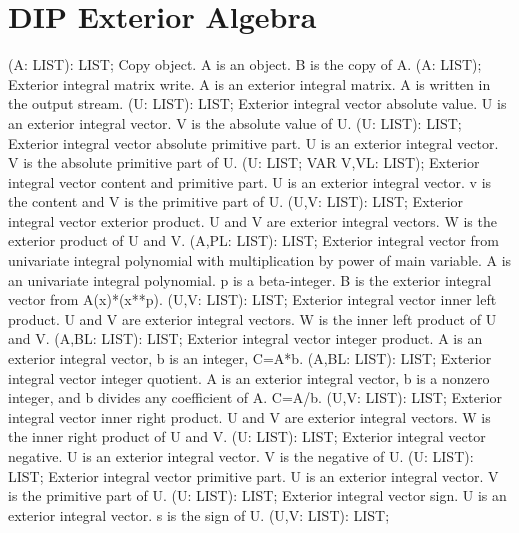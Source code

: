 \section{ DIP Exterior Algebra  } 
 (A: LIST): LIST; \eproc
\bcom Copy object. A is an object. B is the copy of A. \ecom 
{} (A: LIST); \eproc
\bcom Exterior integral matrix write. A is an exterior
integral matrix. A is written in the output stream. \ecom 
{} (U: LIST): LIST; \eproc
\bcom Exterior integral vector absolute value. U is an
exterior integral vector. V is the absolute value of U.  \ecom 
{} (U: LIST): LIST; \eproc
\bcom Exterior integral vector absolute primitive part. U is an
exterior integral vector. V is the absolute primitive part of U.  \ecom 
{} (U: LIST; VAR V,VL: LIST); \eproc
\bcom Exterior integral vector content and primitive part.
U is an exterior integral vector. v is the content and
V is the primitive part of U.  \ecom 
{} (U,V: LIST): LIST; \eproc
\bcom Exterior integral vector exterior product. U and V are exterior
integral vectors. W is the exterior product of U and V. \ecom 
{} (A,PL: LIST): LIST; \eproc
\bcom Exterior integral vector from univariate integral polynomial
with multiplication by power of main variable. A is an
univariate integral polynomial. p is a beta-integer. B is the
exterior integral vector from A(x)*(x**p).  \ecom 
{} (U,V: LIST): LIST; \eproc
\bcom Exterior integral vector inner left product. U and V are
exterior integral vectors. W is the inner left
product of U and V. \ecom 
{} (A,BL: LIST): LIST; \eproc
\bcom Exterior integral vector integer product. A is an
exterior integral vector, b is an integer, C=A*b.  \ecom 
{} (A,BL: LIST): LIST; \eproc
\bcom Exterior integral vector integer quotient. A is an
exterior integral vector, b is a nonzero integer,
and b divides any coefficient of A. C=A/b. \ecom 
{} (U,V: LIST): LIST; \eproc
\bcom Exterior integral vector inner right product. U and V are
exterior integral vectors. W is the inner right
product of U and V. \ecom 
{} (U: LIST): LIST; \eproc
\bcom Exterior integral vector negative. U is an exterior
integral vector. V is the negative of U.  \ecom 
{} (U: LIST): LIST; \eproc
\bcom Exterior integral vector primitive part. U is an
exterior integral vector. V is the primitive part of U.  \ecom 
{} (U: LIST): LIST; \eproc
\bcom Exterior integral vector sign. U is an exterior
integral vector. s is the sign of U.  \ecom 
{} (U,V: LIST): LIST; \eproc
